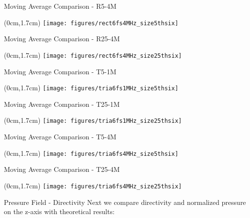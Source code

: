 \documentclass{beamer}
\begin{document}
\begin{frame}{Moving Average Comparison - R5-4M}
 \begin{textblock*}{13cm}(0cm,1.7cm) %
		\texttt{[image: figures/rect6fs4MHz\_size5thsix]}
 \end{textblock*}   
\end{frame}

\begin{frame}{Moving Average Comparison - R25-4M}
 \begin{textblock*}{13cm}(0cm,1.7cm) %
		\texttt{[image: figures/rect6fs4MHz\_size25thsix]}
 \end{textblock*}   
\end{frame}


\begin{frame}{Moving Average Comparison - T5-1M}
 \begin{textblock*}{13cm}(0cm,1.7cm) %
		\texttt{[image: figures/tria6fs1MHz\_size5thsix]}
 \end{textblock*}   
\end{frame}


\begin{frame}{Moving Average Comparison - T25-1M}
 \begin{textblock*}{13cm}(0cm,1.7cm) %
		\texttt{[image: figures/tria6fs1MHz\_size25thsix]}
 \end{textblock*}   
\end{frame}

\begin{frame}{Moving Average Comparison - T5-4M}
 \begin{textblock*}{13cm}(0cm,1.7cm) %
		\texttt{[image: figures/tria6fs4MHz\_size5thsix]}
 \end{textblock*}   
\end{frame}

\begin{frame}{Moving Average Comparison - T25-4M}
 \begin{textblock*}{13cm}(0cm,1.7cm) %
		\texttt{[image: figures/tria6fs4MHz\_size25thsix]}
 \end{textblock*}   
\end{frame}

\begin{frame}{Pressure Field - Directivity}
Next we compare directivity and normalized pressure on the z-axis with theoretical results:
\end{frame}
\end{document}
